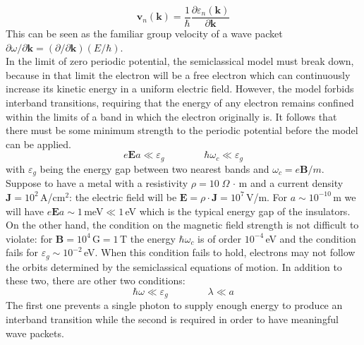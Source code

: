 \documentclass[10.75pt,a4paper,openright,bottom=2cm]{article}
\renewcommand{\Vec}[1]{\boldsymbol{#1}}
\begin{document}
\begin{equation}
\label{eqmot2}
\Vec{v}_n(\Vec{k})=\frac{1}{\hbar}\frac{\partial \varepsilon_n(\Vec{k})}{\partial\Vec{k}}
\end{equation}
This can be seen as the familiar group velocity of a wave packet $\partial\omega/\partial\Vec{k}=(\partial/\partial\Vec{k})(E/\hbar)$.\\
In the limit of zero periodic potential, the semiclassical model must break down, because in that limit the electron will be a free electron which can continuously increase its kinetic energy in a uniform electric field. However, the model forbids interband transitions, requiring that the energy of any electron remains confined within the limits of a band in which the electron originally is. It follows that there must be some minimum strength to the periodic potential before the model can be applied. 
\[
e\Vec{E}a\ll \varepsilon_g \qquad\qquad \hbar\omega_c\ll \varepsilon_g 
\]
with $\varepsilon_g$ being the energy gap between two nearest bands and $\omega_c=e\Vec{B}/m$.\\
Suppose to have a metal with a resistivity $\rho=10\;\Omega\,\cdot$\,m and a current density $\Vec{J}=10^2$\,A/cm$^2$: the electric field will be $\Vec{E}=\rho\cdot\Vec{J}=10^7$\,V/m. For $a\sim10^{-10}$\,m we will have $e\Vec{E}a\sim1$\,meV$\ll1$\,eV which is the typical energy gap of the insulators. On the other hand, the condition on the magnetic field strength is not difficult to violate: for $\Vec{B}=10^4$\,G$=1$\,T the energy $\hbar\omega_c$ is of order $10^{-4}$\,eV and the condition fails for $\varepsilon_g\sim10^{-2}$\,eV. When this condition fails to hold, electrons may not follow the orbits determined by the semiclassical equations of motion. In addition to these two, there are other two conditions:
\[
\hbar\omega\ll \varepsilon_g \qquad \qquad \lambda\ll a
\]
The first one prevents a single photon to supply enough energy to produce an interband transition while the second is required in order to have meaningful wave packets.\\
\end{document}
